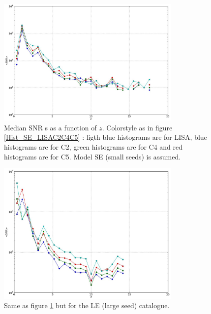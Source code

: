 \documentclass{iopart}
\begin{document}
\begin{figure}[H]
\center
   \includegraphics[width=0.8\textwidth]{FigSMBHPhenomAEI/MedianSNR_SE_LISAC2C4C5.eps}
\caption{Median SNR s as a function of  $z$. Colorstyle as in figure \ref{Hist_SE_LISAC2C4C5} : ligth blue histograms are for LISA, blue histograms are for C2, green histograms are for C4 and red histograms are for C5. Model SE (small seeds) is assumed.
\label{MedianSNR_SE_LISAC2C4C5} } 
\end{figure}

\begin{figure}[H]
\center
   \includegraphics[width=0.8\textwidth]{FigSMBHPhenomAEI/MedianSNR_LE_LISAC2C4C5.eps}
\caption{Same as figure \ref{MedianSNR_SE_LISAC2C4C5} but for the LE (large seed) catalogue.
\label{MedianSNR_LE_LISAC2C4C5} } 
\end{figure}




\end{document}
